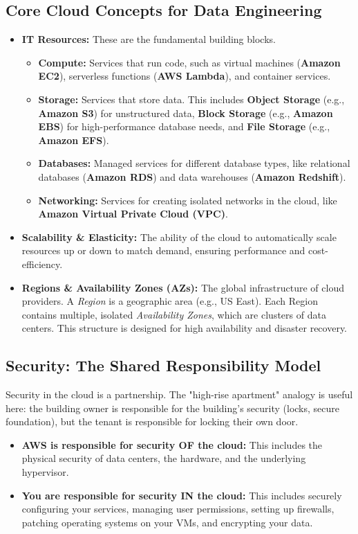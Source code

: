 \documentclass{article}
\begin{document}
\subsection{Core Cloud Concepts for Data Engineering}
\begin{itemize}
    \item \textbf{IT Resources:} These are the fundamental building blocks.
    \begin{itemize}
        \item \textbf{Compute:} Services that run code, such as virtual machines (\textbf{Amazon EC2}), serverless functions (\textbf{AWS Lambda}), and container services.
        \item \textbf{Storage:} Services that store data. This includes \textbf{Object Storage} (e.g., \textbf{Amazon S3}) for unstructured data, \textbf{Block Storage} (e.g., \textbf{Amazon EBS}) for high-performance database needs, and \textbf{File Storage} (e.g., \textbf{Amazon EFS}).
        \item \textbf{Databases:} Managed services for different database types, like relational databases (\textbf{Amazon RDS}) and data warehouses (\textbf{Amazon Redshift}).
        \item \textbf{Networking:} Services for creating isolated networks in the cloud, like \textbf{Amazon Virtual Private Cloud (VPC)}.
    \end{itemize}
    \item \textbf{Scalability \& Elasticity:} The ability of the cloud to automatically scale resources up or down to match demand, ensuring performance and cost-efficiency.
    \item \textbf{Regions \& Availability Zones (AZs):} The global infrastructure of cloud providers. A \textit{Region} is a geographic area (e.g., US East). Each Region contains multiple, isolated \textit{Availability Zones}, which are clusters of data centers. This structure is designed for high availability and disaster recovery.
\end{itemize}

\subsection{Security: The Shared Responsibility Model}
Security in the cloud is a partnership. The "high-rise apartment" analogy is useful here: the building owner is responsible for the building's security (locks, secure foundation), but the tenant is responsible for locking their own door.
\begin{itemize}
    \item \textbf{AWS is responsible for security OF the cloud:} This includes the physical security of data centers, the hardware, and the underlying hypervisor.
    \item \textbf{You are responsible for security IN the cloud:} This includes securely configuring your services, managing user permissions, setting up firewalls, patching operating systems on your VMs, and encrypting your data.
\end{itemize}
\end{document}
